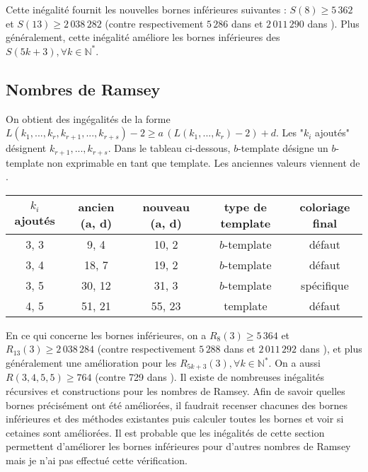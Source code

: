 \documentclass{article}
\begin{document}
Cette inégalité fournit les nouvelles bornes inférieures suivantes : \(S(8) \geqslant 5\,362\) et \(S(13) \geqslant 2\,038\,282\) (contre respectivement \(5\,286\) dans \cite{RowleyRamsey} et \(2\,011\,290\) dans \cite{schurboyz}). Plus généralement, cette inégalité améliore les bornes inférieures des \(S(5 k + 3), \forall k \in \mathbb{N}^*\).

\subsection{Nombres de Ramsey}

On obtient des ingégalités de la forme \(L(k_1, ..., k_r, k_{r+1}, ..., k_{r+s}) - 2 \geqslant a \, (L(k_1, ..., k_r) - 2) + d\). Les "\(k_i\) ajoutés" désignent \( k_{r+1}, ..., k_{r+s}\). Dans le tableau ci-dessous, \(b\)-template désigne un \(b\)-template non exprimable en tant que template. Les anciennes valeurs viennent de \cite{rowleyramseysat}.
\begin{table}[H]\begin{center}
\begin{tabular}{| c | c | c | c | c |}
	\hline
	\(k_i\) ajoutés & ancien (a, d) & nouveau (a, d) & type de template & coloriage final \\
	\hline
	3, 3 & 9, 4 & 10, 2 & \(b\)-template & défaut \\
	\hline
	3, 4 & 18, 7 & 19, 2 & \(b\)-template & défaut \\
	\hline
	3, 5 & 30, 12 & 31, 3 & \(b\)-template & spécifique \\
	\hline
	4, 5 & 51, 21 & 55, 23 & template & défaut \\
	\hline
\end{tabular}
\end{center}\end{table}

En ce qui concerne les bornes inférieures, on a  \(R_8(3) \geqslant 5\,364\) et \(R_{13}(3)\geqslant 2\,038\,284\) (contre respectivement \(5\,288\) dans \cite{RowleyRamsey} et \(2\,011\,292\) dans \cite{schurboyz}), et plus généralement une amélioration pour les \(R_{5 k + 3}(3), \forall k \in \mathbb{N}^*\). On a aussi \(R(3 , 4 , 5 , 5) \geqslant 764\) (contre 729 dans \cite{rowleyramseysat}). Il existe de nombreuses inégalités récursives et constructions pour les nombres de Ramsey. Afin de savoir quelles bornes précisément ont été améliorées, il faudrait recenser chacunes des bornes inférieures et des méthodes existantes puis calculer toutes les bornes et voir si cetaines sont améliorées. Il est probable que les inégalités de cette section permettent d'améliorer les bornes inférieures pour d'autres nombres de Ramsey mais je n'ai pas effectué cette vérification.



\end{document}
